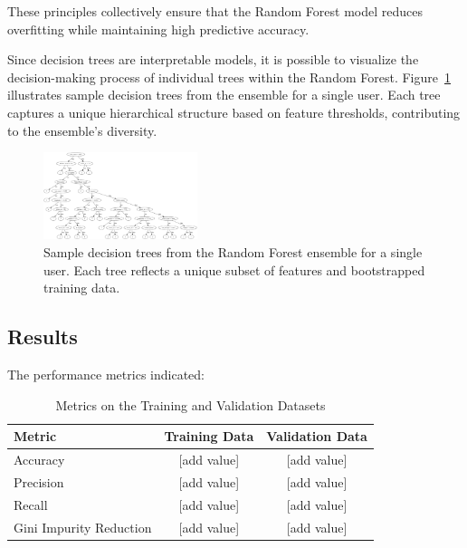 \documentclass[a3paper,12pt]{article}
\begin{document}
These principles collectively ensure that the Random Forest model reduces overfitting while maintaining high predictive accuracy.

Since decision trees are interpretable models, it is possible to visualize the decision-making process of individual trees within the Random Forest. Figure~\ref{fig:random_forest_trees} illustrates sample decision trees from the ensemble for a single user. Each tree captures a unique hierarchical structure based on feature thresholds, contributing to the ensemble's diversity.

\begin{figure}[h!]
    \centering
    \includegraphics[width=0.4\textwidth]{tree} %
    \caption{Sample decision trees from the Random Forest ensemble for a single user. Each tree reflects a unique subset of features and bootstrapped training data.}
    \label{fig:random_forest_trees}
\end{figure}

\subsection{Results}
The performance metrics indicated:

\begin{table}[h]
    \centering
    \begin{tabular}{|l|c|c|}
        \hline
        \textbf{Metric} & \textbf{Training Data} & \textbf{Validation Data} \\ \hline
        Accuracy        & [add value]         & [add value]           \\ \hline
        Precision       & [add value]         & [add value]           \\ \hline
        Recall          & [add value]         & [add value]           \\ \hline
        Gini Impurity Reduction & [add value]   & [add value]           \\ \hline
    \end{tabular}
    \caption{Metrics on the Training and Validation Datasets}
    \label{tab:performance_metrics}
\end{table}
\end{document}

